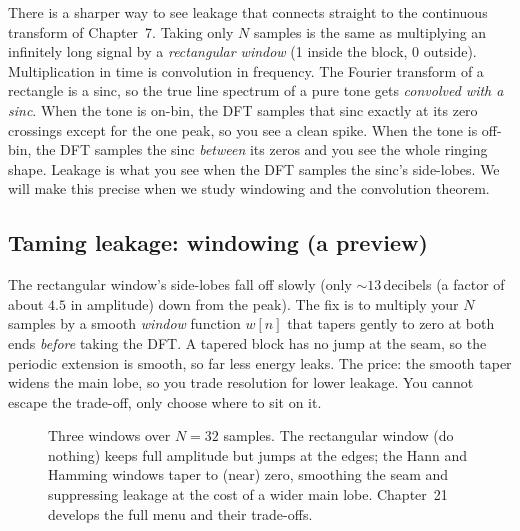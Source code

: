\begin{whybox}
There is a sharper way to see leakage that connects straight to the continuous
transform of Chapter~7. Taking only $N$ samples is the same as multiplying an
infinitely long signal by a \emph{rectangular window} (1 inside the block, 0
outside). Multiplication in time is convolution in frequency. The Fourier
transform of a rectangle is a sinc, so the true line spectrum of a pure tone gets
\emph{convolved with a sinc}. When the tone is on-bin, the DFT samples that sinc
exactly at its zero crossings except for the one peak, so you see a clean spike.
When the tone is off-bin, the DFT samples the sinc \emph{between} its zeros and you
see the whole ringing shape. Leakage is what you see when the DFT samples the sinc's side-lobes. We will
make this precise when we study windowing and the convolution theorem.
\end{whybox}

\subsection*{Taming leakage: windowing (a preview)}

The rectangular window's side-lobes fall off slowly (only $\sim 13$\,decibels (a factor of about $4.5$ in amplitude) down from
the peak). The fix is to multiply your $N$ samples by a smooth \emph{window}
function $w[n]$ that tapers gently to zero at both ends \emph{before} taking the
DFT. A tapered block has no jump at the seam, so the periodic extension is smooth,
so far less energy leaks. The price: the smooth taper widens the main lobe, so you
trade resolution for lower leakage. You cannot escape the trade-off, only choose
where to sit on it.

\begin{figure}[H]
\centering
{}
\caption{Three windows over $N=32$ samples. The rectangular window (do nothing)
keeps full amplitude but jumps at the edges; the Hann and Hamming windows taper to
(near) zero, smoothing the seam and suppressing leakage at the cost of a wider main
lobe. Chapter~21 develops the full menu and their trade-offs.}
\label{ch08:fig-windows}
\end{figure}

